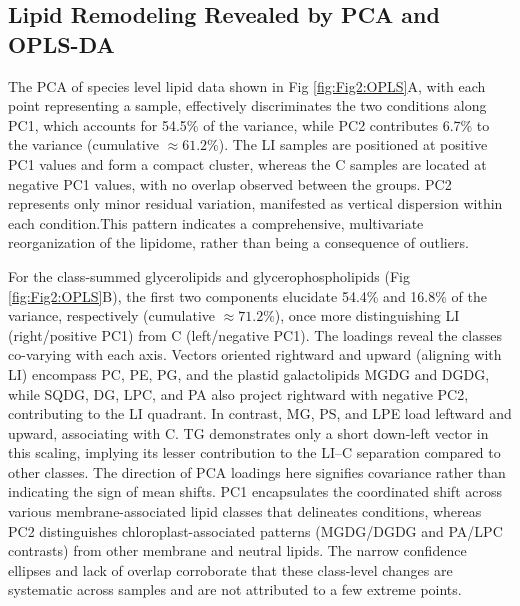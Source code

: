 \documentclass[10pt,letterpaper]{article}
\begin{document}
\begin{itemize}
\subsection*{Lipid Remodeling Revealed by PCA and OPLS-DA}

The PCA of species level lipid data shown in Fig \ref{fig:Fig2:OPLS}A, with each point representing a sample, effectively discriminates the two conditions along PC1, which accounts for 54.5\% of the variance, while PC2 contributes 6.7\% to the variance (cumulative $\approx 61.2\%$). The LI samples are positioned at positive PC1 values and form a compact cluster, whereas the C samples are located at negative PC1 values, with no overlap observed between the groups. PC2 represents only minor residual variation, manifested as vertical dispersion within each condition.This pattern indicates a comprehensive, multivariate reorganization of the lipidome, rather than being a consequence of outliers. 

For the class-summed glycerolipids and glycerophospholipids (Fig \ref{fig:Fig2:OPLS}B), the first two components elucidate 54.4\% and 16.8\% of the variance, respectively (cumulative $\approx 71.2\%$), once more distinguishing LI (right/positive PC1) from C (left/negative PC1). The loadings reveal the classes co-varying with each axis. Vectors oriented rightward and upward (aligning with LI) encompass PC, PE, PG, and the plastid galactolipids MGDG and DGDG, while SQDG, DG, LPC, and PA also project rightward with negative PC2, contributing to the LI quadrant. In contrast, MG, PS, and LPE load leftward and upward, associating with C. TG demonstrates only a short down-left vector in this scaling, implying its lesser contribution to the LI–C separation compared to other classes. The direction of PCA loadings here signifies covariance rather than indicating the sign of mean shifts. PC1 encapsulates the coordinated shift across various membrane-associated lipid classes that delineates conditions, whereas PC2 distinguishes chloroplast-associated patterns (MGDG/DGDG and PA/LPC contrasts) from other membrane and neutral lipids. The narrow confidence ellipses and lack of overlap corroborate that these class-level changes are systematic across samples and are not attributed to a few extreme points. 




\end{itemize}
\end{document}
